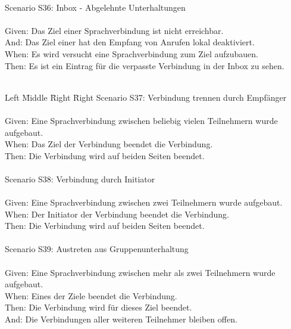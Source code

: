 \begin{tabbing}
    \\
    Scenario S36: \> \> \> Inbox - Abgelehnte Unterhaltungen \\ \\
    Given:  \> \> \> Das Ziel einer Sprachverbindung ist nicht erreichbar. \\
    And:  \> \> \> Das Ziel einer hat den Empfang von Anrufen lokal deaktiviert. \\
    When:   \> \> \> Es wird versucht eine Sprachverbindung zum Ziel aufzubauen.\\
    Then:   \> \> \> Es ist ein Eintrag für die verpasste Verbindung in der Inbox zu sehen.\\
    \\
\end{tabbing}
\begin{tabbing}
    Left \= Middle \= Right \= Right \kill
    Scenario S37: \> \> \> Verbindung trennen durch Empfänger \\ \\
    Given:  \> \> \> Eine Sprachverbindung zwischen beliebig vielen Teilnehmern wurde aufgebaut. \\
    When:   \> \> \> Das Ziel der Verbindung beendet die Verbindung. \\
    Then:   \> \> \> Die Verbindung wird auf beiden Seiten beendet.\\
    \\
    Scenario S38: \> \> \> Verbindung durch Initiator \\ \\
    Given:  \> \> \> Eine Sprachverbindung zwischen zwei Teilnehmern wurde aufgebaut. \\
    When:   \> \> \> Der Initiator der Verbindung beendet die Verbindung. \\
    Then:   \> \> \> Die Verbindung wird auf beiden Seiten beendet.\\
    \\
    Scenario S39: \> \> \> Austreten aus Gruppenunterhaltung \\ \\
    Given:  \> \> \> Eine Sprachverbindung zwischen mehr als zwei Teilnehmern wurde aufgebaut. \\
    When:   \> \> \> Eines der Ziele beendet die Verbindung. \\
    Then:   \> \> \> Die Verbindung wird für dieses Ziel beendet.\\
    And:   \> \> \> Die Verbindungen aller weiteren Teilnehmer bleiben offen.\\

\end{tabbing}
